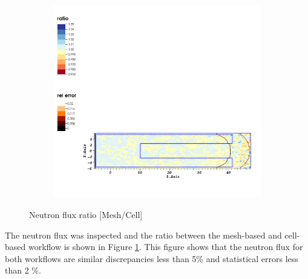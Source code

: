 \begin{figure}
\begin{subfigure}{0.1\textwidth}
    \end{subfigure}
    \begin{subfigure}{0.79\textwidth}
        \centering
        \includegraphics[scale=0.5, trim={4cm 2cm 1cm 22cm}, clip]{figs/ratio_nflux.png}
    \end{subfigure}
    \caption{Neutron flux ratio [Mesh/Cell]}
    \label{fig:n_ratio_smaller}
\end{figure}
 

The neutron flux was inspected and the ratio between the mesh-based and 
cell-based workflow is shown in Figure \ref{fig:n_ratio_smaller}. 
This figure shows that the neutron flux for both workflows are similar 
discrepancies less than 5\% and statistical errors less than 2 \%. 


